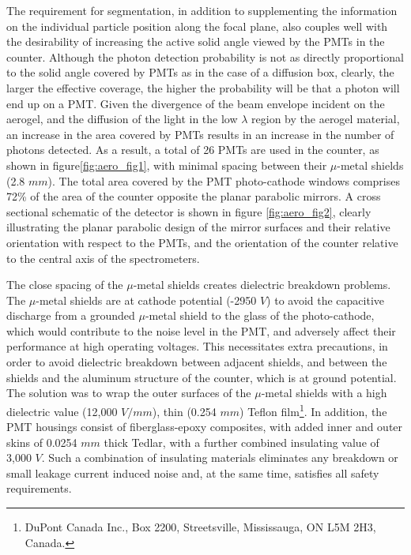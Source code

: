 The requirement for segmentation, in addition to supplementing the information
on the individual particle position along the focal plane, also couples well
with the desirability of increasing the active solid angle viewed by the PMTs
in the counter.  Although the photon detection probability is not as directly
proportional to the solid angle covered by PMTs as in the case of a diffusion
box, clearly, the larger the effective coverage, the higher the probability
will be that a photon will end up on a PMT.  Given the divergence of the beam
envelope incident on the aerogel, and the diffusion of the light in the low
$\lambda$ region by the aerogel material, an increase in the area covered by
PMTs results in an increase in the number of photons detected.  
As a result, a total of 26 PMTs are used in the counter, as shown in 
figure\ref{fig:aero_fig1}, with minimal spacing between their $\mu$-metal shields 
(2.8 $mm$).  
The total area covered by the PMT photo-cathode windows comprises 72\% of the area 
of the counter opposite the planar parabolic mirrors.  
A cross sectional schematic of the detector is shown in figure \ref{fig:aero_fig2}, 
clearly illustrating the planar parabolic design of the mirror surfaces and their 
relative orientation with respect to the PMTs, and the orientation of the counter 
relative to the central axis of the spectrometers. 
   
The close spacing of the $\mu$-metal shields
creates dielectric breakdown problems.  The $\mu$-metal
shields are at cathode potential (-2950 $V$) to avoid the capacitive discharge
from a grounded $\mu$-metal shield to the glass of the photo-cathode, which
would contribute to the noise level in the PMT, and adversely affect their
performance at high operating voltages. This necessitates extra precautions, in
order to avoid dielectric breakdown between adjacent shields, and between the
shields and the aluminum structure of the counter, which is at ground
potential. The solution was to wrap the outer surfaces of the $\mu$-metal
shields with a high dielectric value (12,000 $V/mm$), thin (0.254 $mm$) Teflon
film\footnote{DuPont Canada Inc., Box 2200, Streetsville, Mississauga, ON L5M 2H3, Canada.}.
  In addition, the PMT housings consist of fiberglass-epoxy composites, 
with added inner and outer skins of 0.0254 $mm$ thick Tedlar\footnotemark[1],
with a further combined insulating value of 3,000 $V$.  
Such a combination of insulating materials eliminates any breakdown or small leakage
current induced noise and, at the same time, satisfies all safety requirements.

